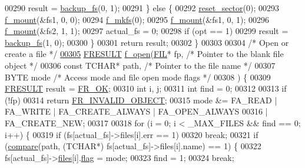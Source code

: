 \begin{DoxyCode}
00290       result = \hyperlink{fileSystem_8c_ac1802ff989bc875c1147d22cf93e8416}{backup\_fs}(0, 1);
00291   \} \textcolor{keywordflow}{else} \{
00292     \hyperlink{fileSystem_8c_afcfe716c836b3b8a019fa38faf56da96}{reset\_sector}(0);
00293     \hyperlink{fileSystem_8c_a06b1816d729a1ee702209d4ddc1d91af}{f\_mount}(&fs1, 0, 0);
00294     \hyperlink{fileSystem_8c_a8e75c990b2a6c64fa783c75aace55059}{f\_mkfs}(0);
00295     \hyperlink{fileSystem_8c_a06b1816d729a1ee702209d4ddc1d91af}{f\_mount}(&fs1, 0, 1);
00296     \hyperlink{fileSystem_8c_a06b1816d729a1ee702209d4ddc1d91af}{f\_mount}(&fs2, 1, 1);
00297     actual\_fs = 0;
00298     \textcolor{keywordflow}{if} (opt == 1)
00299       result = \hyperlink{fileSystem_8c_ac1802ff989bc875c1147d22cf93e8416}{backup\_fs}(1, 0);
00300   \}
00301   \textcolor{keywordflow}{return} result;
00302 \}
00303 
00304 \textcolor{comment}{/* Open or create a file */}
\hypertarget{fileSystem_8c_source_l00305}{}\hyperlink{fileSystem_8h_aefdef7126128d99d0b3bd82c28e54d80}{00305} \hyperlink{fileSystem_8h_a49d0171ecbd362cda5680a0d360db44c}{FRESULT} \hyperlink{fileSystem_8c_aefdef7126128d99d0b3bd82c28e54d80}{f\_open}(\hyperlink{structFIL}{FIL}* fp, \textcolor{comment}{/* Pointer to the blank file object */}
00306 \textcolor{keyword}{const} TCHAR* path, \textcolor{comment}{/* Pointer to the file name */}
00307 BYTE mode \textcolor{comment}{/* Access mode and file open mode flags */}
00308 ) \{
00309   \hyperlink{fileSystem_8h_a49d0171ecbd362cda5680a0d360db44c}{FRESULT} result = \hyperlink{fileSystem_8h_a49d0171ecbd362cda5680a0d360db44ca62fce5cd9df008f8fc85f99706bda5f1}{FR\_OK};
00310   \textcolor{keywordtype}{int} i, j;
00311   \textcolor{keywordtype}{int} find = 0;
00312 
00313   \textcolor{keywordflow}{if} (!fp)
00314     \textcolor{keywordflow}{return} \hyperlink{fileSystem_8h_a49d0171ecbd362cda5680a0d360db44ca3dec4eba481cdf5e99d7cd6009e6dcf8}{FR\_INVALID\_OBJECT};
00315   mode &= FA\_READ | FA\_WRITE | FA\_CREATE\_ALWAYS | FA\_OPEN\_ALWAYS
00316       | FA\_CREATE\_NEW;
00317 
00318   \textcolor{keywordflow}{for} (i = 0; i < \_MAX\_FILES && find == 0; i++) \{
00319     \textcolor{keywordflow}{if} (fs[actual\_fs]->files[i].err == 1)
00320       \textcolor{keywordflow}{break};
00321     \textcolor{keywordflow}{if} (\hyperlink{fileSystem_8c_a2c77bece2713c99a22b9ec7d1d083b47}{compare}(path, (TCHAR*) fs[actual\_fs]->files[i].name) == 1) \{
00322       fs[actual\_fs]->\hyperlink{structFS_a5772298ea6aafc77f842037933531a02}{files}[i].\hyperlink{structFIL_ac409508881f5a16f2998ae675072b376}{flag} = mode;
00323       find = 1;
00324       \textcolor{keywordflow}{break};

\end{DoxyCode}
